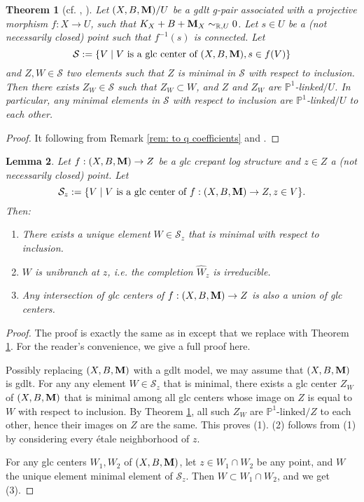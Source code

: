 \documentclass[11pt]{amsart}
\numberwithin{equation}{section}
\newcommand{\Mm}{{\bf{M}}}
\newtheorem{thm}{Theorem}[section]
\newtheorem{lem}[thm]{Lemma}
\theoremstyle{definition}
\theoremstyle{definition}
\theoremstyle{definition}
\begin{document}
\begin{thm}[cf. {\cite[Theorem 3.5]{Bir20}, \cite[Theorem 1.4]{FS20}}]\label{thm: P1 link for gdlt crepant log structure} 
Let $(X,B,\Mm)/U$ be a gdlt g-pair associated with a projective morphism $f: X\rightarrow U$, such that $K_X+B+\Mm_X\sim_{\mathbb R,U}0$. Let $s\in U$ be a (not necessarily closed) point such that $f^{-1}(s)$ is connected. Let
$$\mathcal{S}:=\{V\mid V\text{ is a glc center of }(X,B,\Mm), s\in f(V)\}$$
and $Z,W\in\mathcal{S}$ two elements such that $Z$ is minimal in $\mathcal{S}$ with respect to inclusion. Then there exists $Z_W\in\mathcal{S}$ such that $Z_W\subset W$, and $Z$ and $Z_W$ are $\mathbb P^1$-linked$/U$. In particular, any minimal elements in $\mathcal{S}$ with respect to inclusion are $\mathbb P^1$-linked$/U$ to each other.
\end{thm}
\begin{proof}
It following from Remark \ref{rem: to q coefficients} and \cite[Theorem 1.4]{FS20}.
\end{proof}

\begin{lem}\label{lem: glc locus is unibranch}
Let $f: (X,B,\Mm)\rightarrow Z$ be a glc crepant log structure and $z\in Z$ a (not necessarily closed) point. Let $$\mathcal{S}_z:=\{V\mid V\text{ is a glc center of }f: (X,B,\Mm)\rightarrow Z, z\in V\}.$$
Then:
\begin{enumerate}
    \item There exists a unique element $W\in\mathcal{S}_z$ that is minimal with respect to inclusion. 
    \item $W$ is unibranch at $z$, i.e.  the completion $\hat{W}_z$ is irreducible.
    \item Any intersection of glc centers of $f: (X,B,\Mm)\rightarrow Z$  is also a union of glc centers.
\end{enumerate}
\end{lem}
\begin{proof}
The proof is exactly the same as in \cite[Proof of Corollary 4.41]{Kol13} except that we replace \cite[Theorem 4.40]{Kol13} with Theorem \ref{thm: P1 link for gdlt crepant log structure}. For the reader's convenience, we give a full proof here. 

Possibly replacing $(X,B,\Mm)$ with a gdlt model, we may assume that $(X,B,\Mm)$ is gdlt. For any any element $W\in\mathcal{S}_z$ that is minimal, there exists a glc center $Z_W$ of $(X,B,\Mm)$ that is minimal among all glc centers whose image on $Z$ is equal to $W$ with respect to inclusion. By Theorem \ref{thm: P1 link for gdlt crepant log structure}, all such $Z_W$ are $\mathbb P^1$-linked$/Z$ to each other, hence their images on $Z$ are the same. This proves (1). (2) follows from (1) by considering every \'etale neighborhood of $z$. 

For any glc centers $W_1,W_2$ of $(X,B,\Mm)$, let $z\in W_1\cap W_2$ be any point, and $W$ the unique element minimal element of $\mathcal{S}_z$. Then $W\subset W_1\cap W_2$, and we get (3).
\end{proof}
\end{document}
